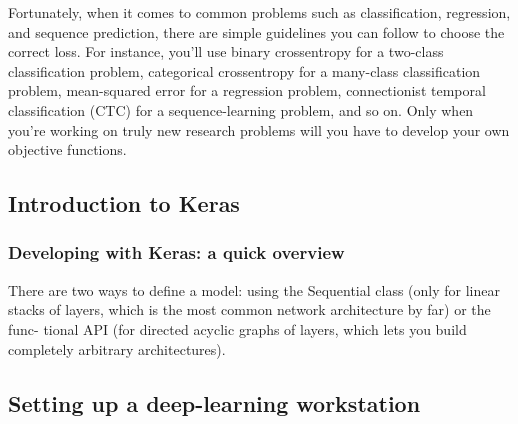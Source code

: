 \documentclass{article}
\numberwithin{equation}{section} %
\begin{document}
Fortunately, when it comes to common problems such as classification, regression,
and sequence prediction, there are simple guidelines you can follow to choose the
correct loss. For instance, you’ll use binary crossentropy for a two-class classification problem, categorical crossentropy for a many-class classification problem, mean-squared error for a regression problem, connectionist temporal classification (CTC) for a sequence-learning problem, and so on. Only when you’re working on truly new research problems will you have to develop your own objective functions. \\

\subsection{Introduction to Keras}

\subsubsection{Developing with Keras: a quick overview}

There are two ways to define a model: using the Sequential class (only for linear
stacks of layers, which is the most common network architecture by far) or the func-
tional API (for directed acyclic graphs of layers, which lets you build completely arbitrary architectures).


\subsection{Setting up a deep-learning workstation}
\end{document}
